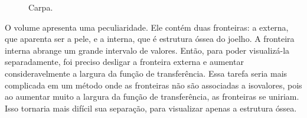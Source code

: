 \begin{figure}[h]
	\centering
	\caption{Carpa.}
	\label{fig:r_m_carp}
\end{figure}

\newpage
	O volume  apresenta uma peculiaridade. Ele contém duas fronteiras: a externa, que aparenta ser a pele, e a interna, que é estrutura óssea do joelho. A fronteira interna abrange um grande intervalo de valores. Então, para poder visualizá-la separadamente, foi preciso desligar a fronteira externa e aumentar consideravelmente a largura da função de transferência. Essa tarefa seria mais complicada em um método onde as fronteiras não são associadas a isovalores, pois ao aumentar muito a largura da função de transferência, as fronteiras se uniriam. Isso tornaria mais difícil sua separação, para visualizar apenas a estrutura óssea.

